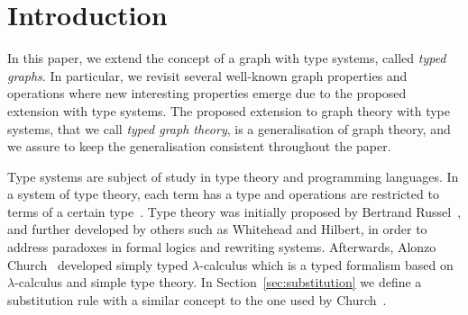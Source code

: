 \documentclass[preprint,12pt]{elsarticle}
\theoremstyle{plain}
\begin{document}
\linenumbers

\section{Introduction}

In this paper, we extend the concept of a graph with type systems,
called \textit{typed graphs}.
In particular, we revisit several well-known graph properties and operations
where new interesting properties emerge due to the proposed
extension with type systems.
The proposed extension to graph theory with type systems,
that we call \textit{typed graph theory}, is a generalisation of
graph theory, and we assure to keep the generalisation
consistent throughout the paper.

Type systems are subject of study in type theory and programming languages.
In a system of type theory, each term has a type and operations are restricted
to terms of a certain type~\cite{russell1908,church1940}.
Type theory was initially proposed by Bertrand Russel~\cite{russell1908},
and further developed by others such as Whitehead and Hilbert,
in order to address paradoxes in formal logics and rewriting systems.
Afterwards, Alonzo Church~\cite{church1940} developed
simply typed $\lambda$-calculus which
is a typed formalism based on $\lambda$-calculus and 
simple type theory.
In Section~\ref{sec:substitution} we define
a substitution rule with a similar concept to the one used by Church~\cite{church1940}.

\end{document}
